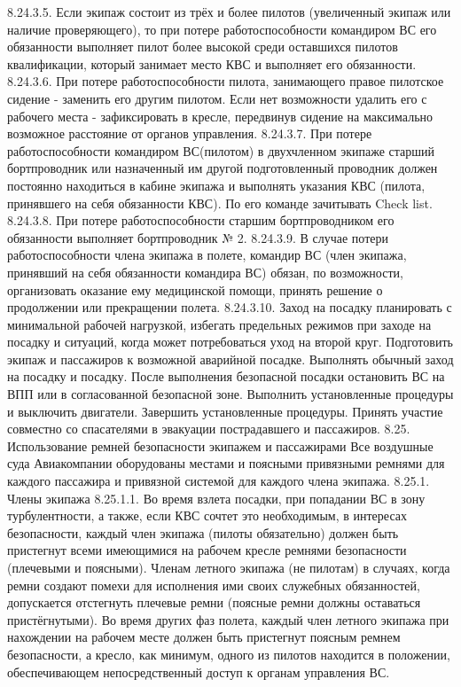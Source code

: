 8.24.3.5. Если экипаж состоит из трёх и более пилотов (увеличенный экипаж или наличие проверяющего), то при потере работоспособности командиром ВС его обязанности выполняет пилот более высокой среди оставшихся пилотов квалификации, который занимает место КВС и выполняет его обязанности.
8.24.3.6. При потере работоспособности пилота, занимающего правое пилотское сидение - заменить его другим пилотом. Если нет возможности удалить его с рабочего места - зафиксировать в кресле, передвинув сидение на максимально возможное расстояние от органов управления.
8.24.3.7. При потере работоспособности командиром ВС(пилотом) в двухчленном экипаже старший бортпроводник или назначенный им другой подготовленный проводник должен постоянно находиться в кабине экипажа и выполнять указания КВС (пилота, принявшего на себя обязанности КВС). По его команде зачитывать Check list.
8.24.3.8. При потере работоспособности старшим бортпроводником его обязанности выполняет бортпроводник № 2.
8.24.3.9. В случае потери работоспособности члена экипажа в полете, командир ВС (член экипажа, принявший на себя обязанности командира ВС) обязан, по возможности, организовать оказание ему медицинской помощи, принять решение о продолжении или прекращении полета.
8.24.3.10. Заход на посадку планировать с минимальной рабочей нагрузкой, избегать предельных режимов при заходе на посадку и ситуаций, когда может потребоваться уход на второй круг.
Подготовить экипаж и пассажиров к возможной аварийной посадке. Выполнять обычный заход на посадку и посадку. После выполнения безопасной посадки остановить ВС на ВПП или в согласованной безопасной зоне. Выполнить установленные процедуры и выключить двигатели. Завершить установленные процедуры. Принять участие совместно со спасателями в эвакуации пострадавшего и пассажиров.
8.25. Использование ремней безопасности экипажем и пассажирами
Все воздушные суда Авиакомпании оборудованы местами и поясными привязными ремнями для каждого пассажира и привязной системой для каждого члена экипажа.
8.25.1. Члены экипажа
8.25.1.1. Во время взлета посадки, при попадании ВС в зону турбулентности, а также, если КВС сочтет это необходимым, в интересах безопасности, каждый член экипажа (пилоты обязательно) должен быть пристегнут всеми имеющимися на рабочем кресле ремнями безопасности (плечевыми и поясными). Членам летного экипажа (не пилотам) в случаях, когда ремни создают помехи для исполнения ими своих служебных обязанностей, допускается отстегнуть плечевые ремни (поясные ремни должны оставаться пристёгнутыми).
Во время других фаз полета, каждый член летного экипажа при нахождении на рабочем месте должен быть пристегнут поясным ремнем безопасности, а кресло, как минимум, одного из пилотов находится в положении, обеспечивающем непосредственный доступ к органам управления ВС.

